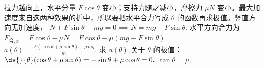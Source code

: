 拉力越向上，水平分量 \(F\cos\theta\) 变小；支持力随之减小，摩擦力 \(\mu N\) 变小。最大加速度来自这两种效果的折中，所以要把水平合力写成 \(\theta\) 的函数再求极值。竖直方向无加速度，
 \(N+F\sin\theta-mg=0 \implies N=mg-F\sin\theta.\) 
水平方向合力为
 \(F_{\text{合},x}=F\cos\theta-\mu N =F\cos\theta-\mu(mg-F\sin\theta).\) 
 \(a(\theta)=\frac{F(\cos\theta+\mu\sin\theta)-\mu mg}{m}.\) 
求 \(a(\theta)\) 关于 \(\theta\) 的极值：
 \(\dv{}{\theta}(\cos\theta+\mu\sin\theta) =-\sin\theta+\mu\cos\theta=0.\) 
 \(\tan\theta=\mu.\) 
